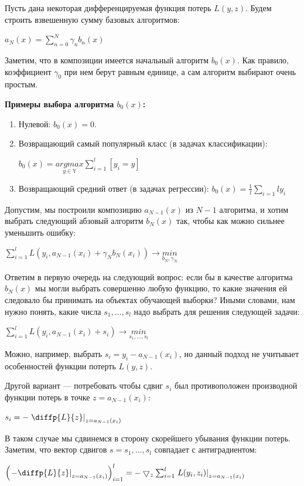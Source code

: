 \documentclass{article}
\begin{document}
Пусть дана некоторая дифференцируемая функция потерь $L(y, z)$. Будем строить взвешенную сумму базовых алгоритмов:

$a_N(x) = \sum_{n=0}^{N}\gamma_n b_n(x)$

Заметим, что в композиции имеется начальный алгоритм $b_0(x)$. Как правило, коэффициент $\gamma_0$ при нем берут равным единице, а сам алгоритм выбирают очень простым.

\textbf{Примеры выбора алгоритма $b_0(x)$:}

\begin{enumerate}
	\item Нулевой: $b_0(x) = 0$.
	\item Возвращающий самый популярный класс (в задачах классификации):
	
	$b_0(x) = \underset{y\in\mathbf{\mathbb{Y}}}{argmax}\sum_{i=1}^{l}[y_i=y]$
	\item Возвращающий средний ответ (в задачах регрессии):	
	$b_0(x) = \frac{1}{l}\sum_{i=1}{l}y_i$
\end{enumerate}

Допустим, мы построили композицию $a_{N-1}(x)$ из $N-1$ алгоритма, и хотим выбрать следующий абзовый алгоритм $b_N(x)$ так, чтобы как можно сильнее уменьшить ошибку:

$\sum_{i=1}^{l} L\left(y_i,a_{N-1}(x_i) + \gamma_N b_N(x_i)\right)\rightarrow \underset{b_N,\gamma_N}{min}$

Ответим в первую очередь на следующий вопрос: если бы в качестве алгоритма $b_N (x)$ мы могли выбрать совершенно любую функцию, то какие значения ей следовало бы принимать на объектах обучающей выборки? Иными словами, нам нужно понять, какие числа $s_1,\ldots, s_l$ надо выбрать для решения следующей задачи:

$\sum_{i=1}^{l} L\left(y_i, a_{N-1}(x_i) +s_i\right)\rightarrow \underset{s_1,\ldots, s_l}{min}$

Можно, например, выбрать $s_i = y_i - a_{N-1}(x_i)$, но данный подход не учитывает особенностей функции потерть $L(y,z)$.

Другой вариант --- потребовать чтобы сдвиг $s_i$ был противоположен производной функции потерь в точке $z=a_{N-1}(x_i)$:

$s_i = -\left. \diffp{L}{z} \right|_{z=a_{N-1}(x_i)}$

В таком случае мы сдвинемся в сторону скорейшего убывания функции потерь. Заметим, что вектор сдвигов $s = s_1,\ldots, s_l$ совпадает с антиградиентом:

$\left(\left. -\diffp{L}{z}\right|_{z=a_{N-1}(x_i)}\right)^l_{i=1} = -\bigtriangledown_z \sum_{i=1}^{l}\left. L(y_i,z_i) \right|_{z=a_{N-1}(x_i)}$
\end{document}
